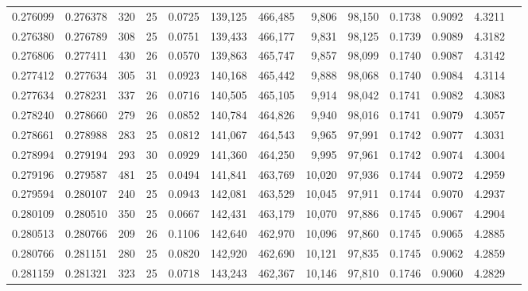 \begin{tabular}{rrrrrrrrrrrrr}
0.276099 & 0.276378 &   320 &  25 &                                     0.0725 & 139,125 & 466,485 &   9,806 &  98,150 & 0.1738 & 0.9092 & 4.3211 \\
0.276380 & 0.276789 &   308 &  25 &                                     0.0751 & 139,433 & 466,177 &   9,831 &  98,125 & 0.1739 & 0.9089 & 4.3182 \\
0.276806 & 0.277411 &   430 &  26 &                                     0.0570 & 139,863 & 465,747 &   9,857 &  98,099 & 0.1740 & 0.9087 & 4.3142 \\
0.277412 & 0.277634 &   305 &  31 &                                     0.0923 & 140,168 & 465,442 &   9,888 &  98,068 & 0.1740 & 0.9084 & 4.3114 \\
0.277634 & 0.278231 &   337 &  26 &                                     0.0716 & 140,505 & 465,105 &   9,914 &  98,042 & 0.1741 & 0.9082 & 4.3083 \\
0.278240 & 0.278660 &   279 &  26 &                                     0.0852 & 140,784 & 464,826 &   9,940 &  98,016 & 0.1741 & 0.9079 & 4.3057 \\
0.278661 & 0.278988 &   283 &  25 &                                     0.0812 & 141,067 & 464,543 &   9,965 &  97,991 & 0.1742 & 0.9077 & 4.3031 \\
0.278994 & 0.279194 &   293 &  30 &                                     0.0929 & 141,360 & 464,250 &   9,995 &  97,961 & 0.1742 & 0.9074 & 4.3004 \\
0.279196 & 0.279587 &   481 &  25 &                                     0.0494 & 141,841 & 463,769 &  10,020 &  97,936 & 0.1744 & 0.9072 & 4.2959 \\
0.279594 & 0.280107 &   240 &  25 &                                     0.0943 & 142,081 & 463,529 &  10,045 &  97,911 & 0.1744 & 0.9070 & 4.2937 \\
0.280109 & 0.280510 &   350 &  25 &                                     0.0667 & 142,431 & 463,179 &  10,070 &  97,886 & 0.1745 & 0.9067 & 4.2904 \\
0.280513 & 0.280766 &   209 &  26 &                                     0.1106 & 142,640 & 462,970 &  10,096 &  97,860 & 0.1745 & 0.9065 & 4.2885 \\
0.280766 & 0.281151 &   280 &  25 &                                     0.0820 & 142,920 & 462,690 &  10,121 &  97,835 & 0.1745 & 0.9062 & 4.2859 \\
0.281159 & 0.281321 &   323 &  25 &                                     0.0718 & 143,243 & 462,367 &  10,146 &  97,810 & 0.1746 & 0.9060 & 4.2829 \\

\end{tabular}
